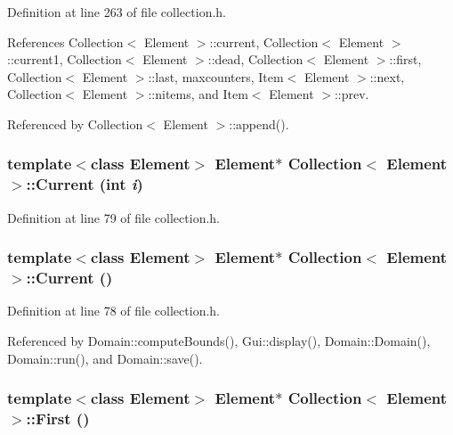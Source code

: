 Definition at line 263 of file collection.h.

References Collection$<$ Element $>$::current, Collection$<$ Element $>$::current1, Collection$<$ Element $>$::dead, Collection$<$ Element $>$::first, Collection$<$ Element $>$::last, maxcounters, Item$<$ Element $>$::next, Collection$<$ Element $>$::nitems, and Item$<$ Element $>$::prev.

Referenced by Collection$<$ Element $>$::append().\hypertarget{classCollection_c6e395083a0e027102bc3ed3d22c9aa5}{
\subsubsection[{Current}]{\setlength{\rightskip}{0pt plus 5cm}template$<$class Element$>$ Element$\ast$ {\bf Collection}$<$ Element $>$::Current (int {\em i})}}
\label{classCollection_c6e395083a0e027102bc3ed3d22c9aa5}




Definition at line 79 of file collection.h.\hypertarget{classCollection_1fc1b94ca31de8d5e45de65dac9d911f}{
\subsubsection[{Current}]{\setlength{\rightskip}{0pt plus 5cm}template$<$class Element$>$ Element$\ast$ {\bf Collection}$<$ Element $>$::Current ()}}
\label{classCollection_1fc1b94ca31de8d5e45de65dac9d911f}




Definition at line 78 of file collection.h.

Referenced by Domain::computeBounds(), Gui::display(), Domain::Domain(), Domain::run(), and Domain::save().\hypertarget{classCollection_40aead667bc00ad6a89d58c76add2f1f}{
\subsubsection[{First}]{\setlength{\rightskip}{0pt plus 5cm}template$<$class Element$>$ Element$\ast$ {\bf Collection}$<$ Element $>$::First ()}}
\label{classCollection_40aead667bc00ad6a89d58c76add2f1f}




